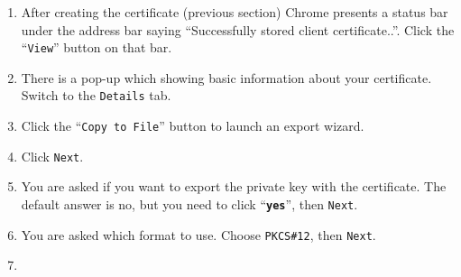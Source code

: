\begin{minipage}{\textwidth}%
\begin{multicols}{2}
  \begin{enumerate}
  \item After creating the certificate (previous section) Chrome
    presents a status bar under the address bar saying ``Successfully
    stored client certificate..''.  Click the ``\texttt{View}'' button
    on that bar.
  \item There is a pop-up which showing basic information about your
    certificate.  Switch to the \texttt{Details} tab.
  \item Click the ``\texttt{Copy to File}'' button to launch an export
    wizard.
  \item Click \texttt{Next}.
  \item You are asked if you want to export the private key with the
    certificate.  The default answer is no, but you need to click
    ``\textbf{\texttt{yes}}'', then \texttt{Next}.
  \item You are asked which format to use.  Choose \texttt{PKCS\#12},
    then \texttt{Next}.
  \item \pwadvice
  \end{enumerate}
\end{multicols}
\end{minipage}
